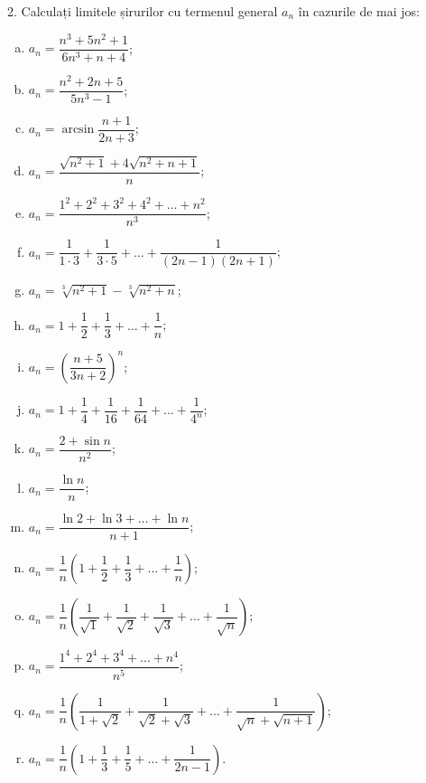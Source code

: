 2. Calculați limitele șirurilor cu termenul general $ a_n $ în cazurile de mai jos:
\begin{enumerate}[(a)]
    \item $ a_n = \dfrac{n^3 + 5n^2 + 1}{6n^3 + n + 4} $;
    \item $ a_n = \dfrac{n^2 + 2n + 5}{5n^3 - 1} $;
    \item $ a_n = \arcsin \dfrac{n + 1}{2n + 3} $;
    \item $ a_n = \dfrac{\sqrt{n^2 + 1} + 4\sqrt{n^2 + n + 1}}{n} $;
    \item $ a_n = \dfrac{1^2 + 2^2 + 3^2 + 4^2 + \dots + n^2}{n^3} $;
    \item $ a_n = \dfrac{1}{1 \cdot 3} + \dfrac{1}{3 \cdot 5} + \dots + \dfrac{1}{(2n - 1)(2n + 1)} $;
    \item $ a_n = \sqrt[3]{n^2 + 1} - \sqrt[3]{n^2 + n} $;
    \item $ a_n = 1 + \dfrac{1}{2} + \dfrac{1}{3} + \dots + \dfrac{1}{n} $;
    \item $ a_n = \left( \dfrac{n+5}{3n + 2} \right)^n $;
    \item $ a_n = 1 + \dfrac{1}{4} + \dfrac{1}{16} + \dfrac{1}{64} + \dots + \dfrac{1}{4^n} $;
    \item $ a_n = \dfrac{2 + \sin n}{n^2} $;
    \item $ a_n = \dfrac{\ln n}{n} $;
    \item $ a_n = \dfrac{\ln 2 + \ln 3 + \dots + \ln n}{n + 1} $;
    \item $ a_n = \dfrac{1}{n} \left( 1 + \dfrac{1}{2} + \dfrac{1}{3} + \dots + \dfrac{1}{n} \right) $;
    \item $ a_n = \dfrac{1}{n} \left( \dfrac{1}{\sqrt{1}} + \dfrac{1}{\sqrt{2}} + \dfrac{1}{\sqrt{3}} + \dots + \dfrac{1}{\sqrt{n}} \right) $;
    \item $ a_n = \dfrac{1^4 + 2^4 + 3^4 + \dots + n^4}{n^5} $;
    \item $ a_n = \dfrac{1}{n} \left( \dfrac{1}{1 + \sqrt{2}} + \dfrac{1}{\sqrt{2} + \sqrt{3}} + \dots + \dfrac{1}{\sqrt{n} + \sqrt{n+1}} \right) $;
    \item $ a_n = \dfrac{1}{n} \left( 1 + \dfrac{1}{3} + \dfrac{1}{5} + \dots + \dfrac{1}{2n - 1} \right) $.
\end{enumerate}

